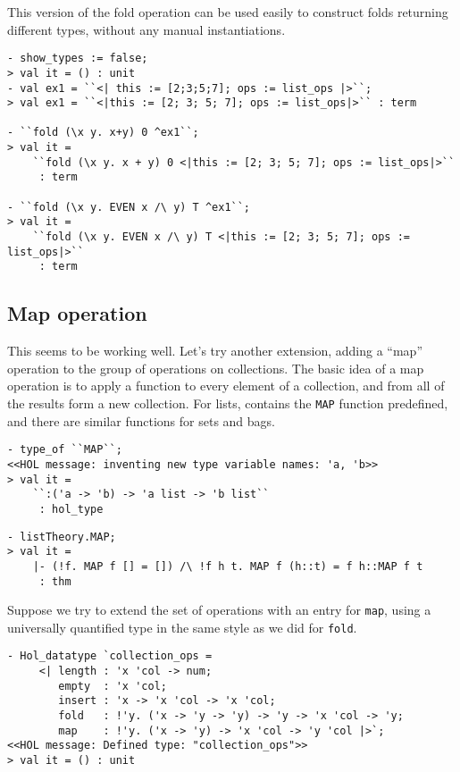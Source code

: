 This version of the fold operation can be used easily to construct folds
returning different types, without any manual instantiations.
\begin{session}
\begin{verbatim}
- show_types := false;
> val it = () : unit
- val ex1 = ``<| this := [2;3;5;7]; ops := list_ops |>``;
> val ex1 = ``<|this := [2; 3; 5; 7]; ops := list_ops|>`` : term

- ``fold (\x y. x+y) 0 ^ex1``;
> val it =
    ``fold (\x y. x + y) 0 <|this := [2; 3; 5; 7]; ops := list_ops|>``
     : term

- ``fold (\x y. EVEN x /\ y) T ^ex1``;
> val it =
    ``fold (\x y. EVEN x /\ y) T <|this := [2; 3; 5; 7]; ops := list_ops|>``
     : term
\end{verbatim}
\end{session}

\subsection{Map operation}

This seems to be working well.  Let's try another extension, adding a ``map''
operation to the group of operations on collections.  The basic idea of a map
operation is to apply a function to every element of a collection, and from all
of the results form a new collection.  For lists, \HOL{} contains the \texttt{MAP}
function predefined, and there are similar functions for sets and bags.
\begin{session}
\begin{verbatim}
- type_of ``MAP``;
<<HOL message: inventing new type variable names: 'a, 'b>>
> val it =
    ``:('a -> 'b) -> 'a list -> 'b list``
     : hol_type
\end{verbatim}
\end{session}

\begin{session}
\begin{verbatim}
- listTheory.MAP;
> val it =
    |- (!f. MAP f [] = []) /\ !f h t. MAP f (h::t) = f h::MAP f t
     : thm
\end{verbatim}
\end{session}

Suppose we try to extend the set of operations with an entry for \texttt{map},
using a universally quantified type in the same style as we did for \texttt{fold}.
\begin{session}
\begin{verbatim}
- Hol_datatype `collection_ops =
     <| length : 'x 'col -> num;
        empty  : 'x 'col;
        insert : 'x -> 'x 'col -> 'x 'col;
        fold   : !'y. ('x -> 'y -> 'y) -> 'y -> 'x 'col -> 'y;
        map    : !'y. ('x -> 'y) -> 'x 'col -> 'y 'col |>`;
<<HOL message: Defined type: "collection_ops">>
> val it = () : unit
\end{verbatim}
\end{session}

